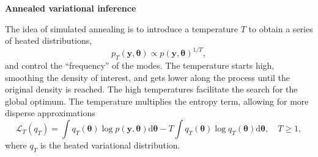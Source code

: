 \documentclass[final]{beamer}
\begin{document}
\begin{multicols*}{3}
\vspace{1em}

\textbf{\large Annealed variational inference}

\vspace{1em}
%

The idea of simulated annealing is to introduce a temperature $T$ to obtain a series of heated distributions,
\begin{equation*}
p_T(\boldsymbol{y},\boldsymbol{\theta}) \propto p(\boldsymbol{y},\boldsymbol{\theta})^{1/T},
\end{equation*}
and control the ``frequency'' of the modes. The temperature starts high, smoothing the density of interest, and gets lower along the process until the original density is reached. The high temperatures facilitate the search for the global optimum. The temperature multiplies the entropy term, allowing for more disperse approximations
\begin{equation}
\mathcal{L}_T(q_T) = \int q_T(\boldsymbol{\theta}) \log p(\boldsymbol{y},\boldsymbol{\theta})\mathrm{d}\boldsymbol{\theta} - T \int q_T(\boldsymbol{\theta}) \log q_T(\boldsymbol{\theta}) \mathrm{d}\boldsymbol{\theta},\quad T\geq 1,
\label{eq:ann_elbo}
\end{equation}
where $q_T$ is the heated variational distribution. 


\end{multicols*}
\end{document}
